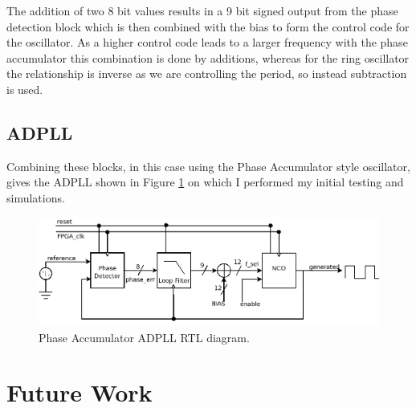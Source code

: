 \documentclass[11pt,english,british]{report}
\begin{document}
The addition of two 8 bit values results in a 9 bit signed output from the phase detection block which is then combined with the bias to form the control code for the oscillator. As a higher control code leads to a larger frequency with the phase accumulator this combination is done by additions, whereas for the ring oscillator the relationship is inverse as we are controlling the period, so instead subtraction is used.

\section{ADPLL}
Combining these blocks, in this case using the Phase Accumulator style oscillator, gives the ADPLL shown in Figure \ref{fig:my_adpll} on which I performed my initial testing and simulations.
\begin{figure}[h]
	\centering
	\includegraphics[scale=0.35]{../rtl}
	\caption{Phase Accumulator ADPLL RTL diagram.}
	\label{fig:my_adpll}
\end{figure}
\chapter{Future Work}


\newpage
 

\end{document}

